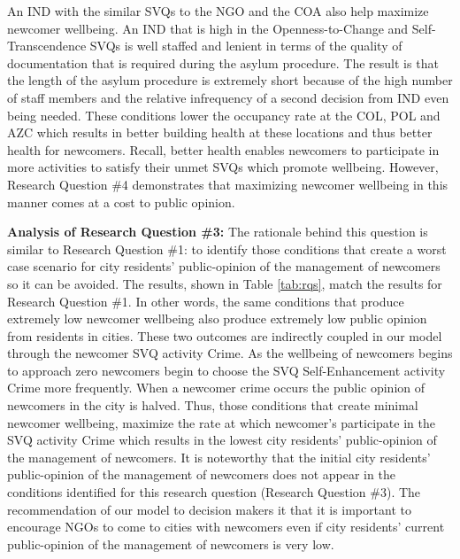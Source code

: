 \documentclass{scspaperproc}
\theoremstyle{scsthe}
\begin{document}
An IND with the similar SVQs to the NGO and the COA also help maximize newcomer wellbeing. An IND that is high in the Openness-to-Change and Self-Transcendence SVQs is well staffed and lenient in terms of the quality of documentation that is required during the asylum procedure. The result is that the length of the asylum procedure is extremely short because of the high number of staff members and the relative infrequency of a second decision from IND even being needed. These conditions lower the occupancy rate at the COL, POL and AZC which results in better building health at these locations and thus better health for newcomers. Recall, better health enables newcomers to participate in more activities to satisfy their unmet SVQs which promote wellbeing. However, Research Question \#4 demonstrates that maximizing newcomer wellbeing in this manner comes at a cost to public opinion. 

{\bf Analysis of Research Question \#3:} The rationale behind this question is similar to Research Question \#1: to identify those conditions that create a worst case scenario for city residents' public-opinion of the management of newcomers so it can be avoided. The results, shown in Table \ref{tab:rqs}, match the results for Research Question \#1. In other words, the same conditions that produce extremely low newcomer wellbeing also produce extremely low public opinion from residents in cities. These two outcomes are indirectly coupled in our model through the newcomer SVQ activity Crime. As the wellbeing of newcomers begins to approach zero newcomers begin to choose the SVQ Self-Enhancement activity Crime more frequently.  When a newcomer crime occurs the public opinion of newcomers in the city is halved. Thus, those conditions that create minimal newcomer wellbeing, maximize the rate at which newcomer's participate in the SVQ activity Crime which results in the lowest city residents' public-opinion of the management of newcomers. It is noteworthy that the initial city residents' public-opinion of the management of newcomers does not appear in the conditions identified for this research question (Research Question \#3). The recommendation of our model to decision makers it that it is important to encourage NGOs to come to cities with newcomers even if city residents' current public-opinion of the management of newcomers is very low. 
\end{document}
